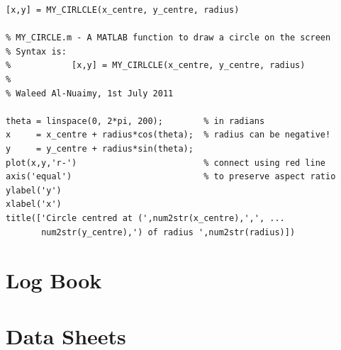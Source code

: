 \documentclass[11pt, a4paper]{article}
\begin{document}
\begin{lstlisting}
[x,y] = MY_CIRLCLE(x_centre, y_centre, radius)

% MY_CIRCLE.m - A MATLAB function to draw a circle on the screen
% Syntax is:
%            [x,y] = MY_CIRLCLE(x_centre, y_centre, radius)
%
% Waleed Al-Nuaimy, 1st July 2011

theta = linspace(0, 2*pi, 200);        % in radians
x     = x_centre + radius*cos(theta);  % radius can be negative!
y     = y_centre + radius*sin(theta);
plot(x,y,'r-')                         % connect using red line
axis('equal')                          % to preserve aspect ratio
ylabel('y')
xlabel('x')
title(['Circle centred at (',num2str(x_centre),',', ...
       num2str(y_centre),') of radius ',num2str(radius)])
\end{lstlisting}


\section{Log Book}


\section{Data Sheets}
\end{document}
